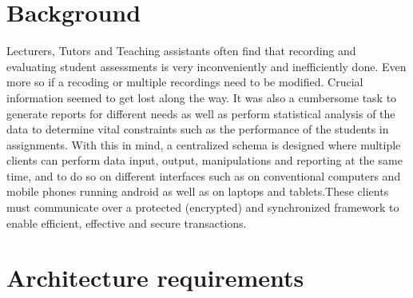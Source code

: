 \documentclass[10pt,a4paper]{article}
\begin{document}
\section{Background}
Lecturers, Tutors and Teaching assistants often find that recording and evaluating student assessments is very inconveniently and inefficiently done. Even more so if a recoding or multiple recordings need to be modified. Crucial information seemed to get lost along the way.\linebreak
It was also a cumbersome task to generate reports for different needs as well as perform statistical analysis of the data to determine vital constraints such as the performance of the students in assignments. \linebreak
With this in mind, a centralized schema is designed where multiple clients can perform data input, output, manipulations and reporting at the same time, and to do so on different interfaces such as on conventional computers and mobile phones running android as well as on laptops and tablets.\linebreak These clients must communicate over a protected (encrypted) and synchronized framework to enable efficient, effective and secure transactions. 

\pagebreak
\section{Architecture requirements}
\end{document}
